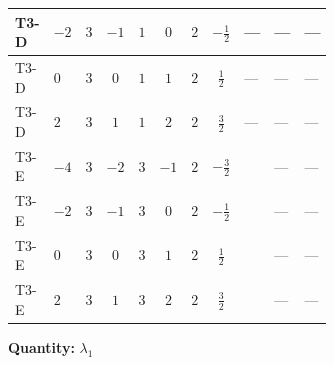 \documentclass[8pt]{article}
\begin{document}
\begin{landscape}
\begin{longtable}{@{}llcccccc >{\raggedright\arraybackslash}p{0.21\linewidth} >{\raggedright\arraybackslash}p{0.21\linewidth} >{\raggedright\arraybackslash}p{0.21\linewidth}@{}}
T3-D & $-2$ & $3$ & $-1$ & $1$ & $0$ & $2$ & $-\frac{1}{2}$ & --- & --- & --- \\
\midrule
T3-D & $0$ & $3$ & $0$ & $1$ & $1$ & $2$ & $\frac{1}{2}$ & --- & --- & --- \\
\midrule
T3-D & $2$ & $3$ & $1$ & $1$ & $2$ & $2$ & $\frac{3}{2}$ & --- & --- & --- \\
\midrule
T3-E & $-4$ & $3$ & $-2$ & $3$ & $-1$ & $2$ & $-\frac{3}{2}$ & \scriptsize\adjustbox{max width=\linewidth}{$\begin{gathered} +3 {\lambda_{HS_2}^{(A)}}^2\end{gathered}$} & --- & --- \\
\midrule
T3-E & $-2$ & $3$ & $-1$ & $3$ & $0$ & $2$ & $-\frac{1}{2}$ & \scriptsize\adjustbox{max width=\linewidth}{$\begin{gathered} +3 {\lambda_{HS_2}^{(A)}}^2\end{gathered}$} & --- & --- \\
\midrule
T3-E & $0$ & $3$ & $0$ & $3$ & $1$ & $2$ & $\frac{1}{2}$ & \scriptsize\adjustbox{max width=\linewidth}{$\begin{gathered} +3 {\lambda_{HS_2}^{(A)}}^2\end{gathered}$} & --- & --- \\
\midrule
T3-E & $2$ & $3$ & $1$ & $3$ & $2$ & $2$ & $\frac{3}{2}$ & \scriptsize\adjustbox{max width=\linewidth}{$\begin{gathered} +3 {\lambda_{HS_2}^{(A)}}^2\end{gathered}$} & --- & --- \\
\midrule
\bottomrule
\end{longtable}
\clearpage
\noindent\textbf{Quantity: }$\lambda_1$\par\smallskip

\end{landscape}
\end{document}
